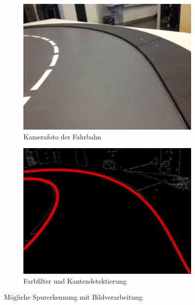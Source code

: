 \begin{figure} [hbp]
	\centering
	\begin{subfigure}[b]{0.4\textwidth}
		\includegraphics[width=\textwidth]{fig/FahrbahnFoto.png}
		\caption{Kamerafoto der Fahrbahn}
	\end{subfigure}
	\hfill
	\begin{subfigure}[b]{0.4\textwidth}
		\includegraphics[width=\textwidth]{fig/ColorFilter.png}
		\caption{Farbfilter und Kantendetektierung}
\end{subfigure}
	\caption{Mögliche Spurerkennung mit Bildverarbeitung}\label{fig:SpurerkennungKamera}
\end{figure}

